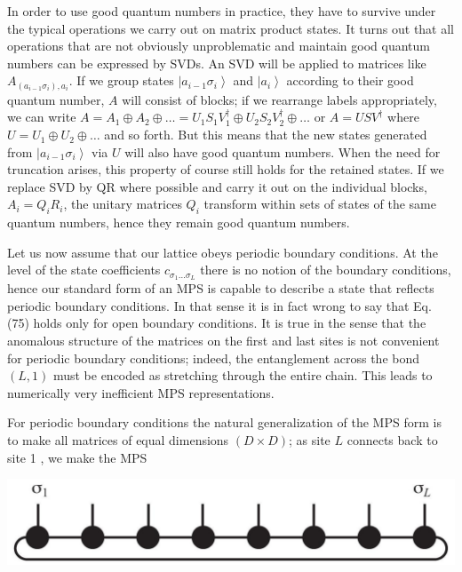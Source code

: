 \documentclass[12pt]{article}
\begin{document}
In order to use good quantum numbers in practice, they have to survive under the typical operations we carry out on matrix product states. It turns out that all operations that are not obviously unproblematic and maintain good quantum numbers can be expressed by SVDs. An SVD will be applied to matrices like $A_{\left(a_{i-1} \sigma_{i}\right), a_{i}}$. If we group states $\left|a_{i-1} \sigma_{i}\right\rangle$ and $\left|a_{i}\right\rangle$ according to their good quantum number, $A$ will consist of blocks; if we rearrange labels appropriately, we can write $A=A_{1} \oplus A_{2} \oplus \ldots=U_{1} S_{1} V_{1}^{\dagger} \oplus U_{2} S_{2} V_{2}^{\dagger} \oplus \ldots$ or $A=U S V^{\dagger}$ where $U=U_{1} \oplus U_{2} \oplus \ldots$ and so forth. But this means that the new states generated from $\left|a_{i-1} \sigma_{i}\right\rangle$ via $U$ will also have good quantum numbers. When the need for truncation arises, this property of course still holds for the retained states. If we replace SVD by QR where possible and carry it out on the individual blocks, $A_{i}=Q_{i} R_{i}$, the unitary matrices $Q_{i}$ transform within sets of states of the same quantum numbers, hence they remain good quantum numbers.

Let us now assume that our lattice obeys periodic boundary conditions. At the level of the state coefficients $c_{\sigma_{1} \ldots \sigma_{L}}$ there is no notion of the boundary conditions, hence our standard form of an MPS is capable to describe a state that reflects periodic boundary conditions. In that sense it is in fact wrong to say that Eq. (75) holds only for open boundary conditions. It is true in the sense that the anomalous structure of the matrices on the first and last sites is not convenient for periodic boundary conditions; indeed, the entanglement across the bond $(L, 1)$ must be encoded as stretching through the entire chain. This leads to numerically very inefficient MPS representations.

For periodic boundary conditions the natural generalization of the MPS form is to make all matrices of equal dimensions $(D \times D)$; as site $L$ connects back to site 1 , we make the MPS

\begin{center}
\includegraphics[max width=\textwidth]{2024_05_04_afc4ad226da9ccfe0ac8g-031}
\end{center}
\end{document}
